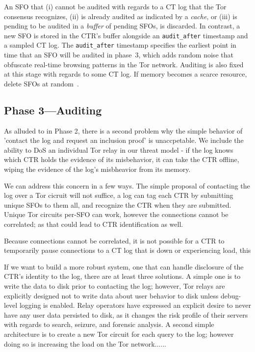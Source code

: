 An SFO that
    (i) cannot be audited with regards to a CT log that the Tor consensus
        recognizes,
    (ii) is already audited as indicated by a \emph{cache}, or
    (iii) is pending to be audited in a \emph{buffer} of pending SFOs,
is discarded.  In contrast, a new SFO is stored in the CTR's buffer
alongside an \texttt{audit\_after} timestamp and a sampled CT log.  The
\texttt{audit\_after} timestamp specifies the earliest point in time that an SFO
will be audited in phase~3, which adds random noise that obfuscate real-time
browsing patterns in the Tor network.  Auditing is also fixed at this stage with
regards to some CT log.  If memory becomes a scarce resource, delete SFOs at
random~\cite{nordberg}.



\subsection{Phase 3---Auditing} \label{sec:base:phase3}

As alluded to in Phase 2, there is a second problem why the simple behavior of
'contact the log and request an inclusion proof' is unaccpetable. We include
the ability to DoS an individual Tor relay in our threat model - if the log
knows which CTR holds the evidence of its misbehavior, it can take the CTR
offline, wiping the evidence of the log's misbheavior from its memory. 

We can address this concern in a few ways. The simple proposal of contacting
the log over a Tor cicruit will not suffice, a log can tag each CTR by
submitting unique SFOs to them all, and recognize the CTR when they are
submitted. Unique Tor circuits per-SFO can work, however the connections
cannot be correlated; as that could lead to CTR identification as well.

Because connections cannot be correlated, it is not possible for a CTR to
temporarily pause connections to a CT log that is down or experiencing load, this

If we want to build a more robust system, one that can handle disclosure of
the CTR's identity to the log, there are at least three solutions. A simple one
is to write the data to disk prior to contacting the log; however, Tor relays
are explicitly designed not to write data about user behavior to disk unless
debug-level logging is enabled. Relay operators have expressed an explicit desire
to never have any user data persisted to disk, as it changes the risk profile of
their servers with regards to search, seizure, and forensic analysis. A second
simple architecture is to create a new Tor circuit for each query to the log; 
however doing so is increasing the load on the Tor network......

